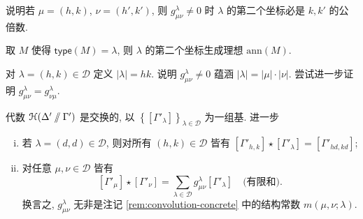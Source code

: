 \begin{exercise}
	说明若 $\mu = (h,k)$, $\nu = (h',k')$, 则 $g^\lambda_{\mu\nu} \neq 0$ 时 $\lambda$ 的第二个坐标必是 $k, k'$ 的公倍数.
	
	\begin{hint}
		取 $M$ 使得 $\mathsf{type}(M) = \lambda$, 则 $\lambda$ 的第二个坐标生成理想 $\mathrm{ann}(M)$.
	\end{hint}
\end{exercise}

\begin{exercise}
	对 $\lambda = (h,k) \in \mathcal{D}$ 定义 $|\lambda| = hk$. 说明 $g^\lambda_{\mu\nu} \neq 0$ 蕴涵 $|\lambda| = |\mu| \cdot |\nu|$. 尝试进一步证明 $g^\lambda_{\mu\nu} = g^\lambda_{\nu\mu}$.
\end{exercise}

\begin{theorem}\label{prop:Hall-Hecke}
	代数 $\EuScript{H}(\Delta' \sslash \Gamma')$ 是交换的, 以 $\left\{ \left[ \Gamma'_\lambda \right] \right\}_{ \lambda \in \mathcal{D}}$ 为一组基. 进一步
	\begin{enumerate}[(i)]
		\item 若 $\lambda = (d,d) \in \mathcal{D}$, 则对所有 $(h, k) \in \mathcal{D}$ 皆有 $[\Gamma'_{h,k}] \star [\Gamma'_\lambda] = [\Gamma'_{hd, kd}]$;
		\item 对任意 $\mu, \nu \in \mathcal{D}$ 皆有
		\[ [\Gamma'_\mu] \star [\Gamma'_\nu] = \sum_{\lambda \in \mathcal{D}} g^\lambda_{\mu\nu} [\Gamma'_\lambda] \quad \text{(有限和)}. \]
		换言之, $g^\lambda_{\mu\nu}$ 无非是注记 \ref{rem:convolution-concrete} 中的结构常数 $m(\mu, \nu; \lambda)$.
	\end{enumerate}
\end{theorem}
